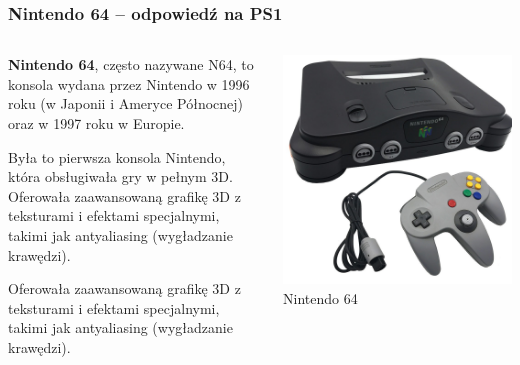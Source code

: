 \documentclass[8pt]{beamer}
\begin{document}
\begin{frame}
\frametitle{Nintendo 64 – odpowiedź na PS1}
\begin{columns}

\begin{column}{0.6\textwidth}
\textbf {Nintendo 64}, często nazywane N64, to konsola wydana przez Nintendo w 1996 roku (w Japonii i Ameryce Północnej) oraz w 1997 roku w Europie.
 
\vspace{0.5em}

Była to pierwsza konsola Nintendo, która obsługiwała gry w pełnym 3D. Oferowała zaawansowaną grafikę 3D z teksturami i efektami specjalnymi, takimi jak antyaliasing (wygładzanie krawędzi).
\vspace{0.5em}

Oferowała zaawansowaną grafikę 3D z teksturami i efektami specjalnymi, takimi jak antyaliasing (wygładzanie krawędzi).

\end{column}

\begin{column}{0.35\textwidth}
        \centering
        \includegraphics[width=\textwidth]{nintendo64.jpg} 
        {\small Nintendo 64} 
    \end{column}
\end{columns}
\end{frame}
\end{document}
